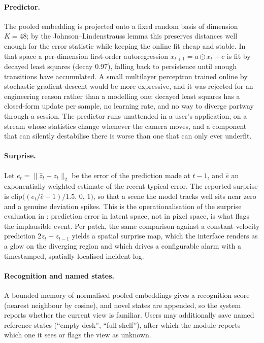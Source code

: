 \documentclass[11pt,onecolumn]{article}
\begin{document}
\paragraph{Predictor.}
The pooled embedding is projected onto a fixed random basis of dimension $K=48$; by the
Johnson--Lindenstrauss lemma \cite{jl1984} this preserves distances well enough for the
error statistic while keeping the online fit cheap and stable. In that space a
per-dimension first-order autoregression $x_{t+1} = a \odot x_t + c$ is fit by decayed
least squares (decay $0.97$), falling back to persistence until enough transitions have
accumulated. A small multilayer perceptron trained online by stochastic gradient descent
would be more expressive, and it was rejected for an engineering reason rather than a
modelling one: decayed least squares has a closed-form update per sample, no learning
rate, and no way to diverge partway through a session. The predictor runs unattended in a
user's application, on a stream whose statistics change whenever the camera moves, and a
component that can silently destabilise there is worse than one that can only ever
underfit.

\paragraph{Surprise.}
Let $e_t = \|\hat z_t - z_t\|_2$ be the error of the prediction made at $t-1$, and
$\bar e$ an exponentially weighted estimate of the recent typical error. The reported
surprise is $\mathrm{clip}\big((e_t/\bar e - 1)/1.5,\,0,\,1\big)$, so that a scene the
model tracks well sits near zero and a genuine deviation spikes. This is the
operationalisation of the surprise evaluation in \cite{lewm2026}: prediction error in
latent space, not in pixel space, is what flags the implausible event. Per patch, the same
comparison against a constant-velocity prediction $2z_t - z_{t-1}$ yields a spatial
surprise map, which the interface renders as a glow on the diverging region and which
drives a configurable alarm with a timestamped, spatially localised incident log.

\paragraph{Recognition and named states.}
A bounded memory of normalised pooled embeddings gives a recognition score (nearest
neighbour by cosine), and novel states are appended, so the system reports whether the
current view is familiar. Users may additionally save named reference states (``empty
desk'', ``full shelf''), after which the module reports which one it sees or flags the view
as unknown.
\end{document}
